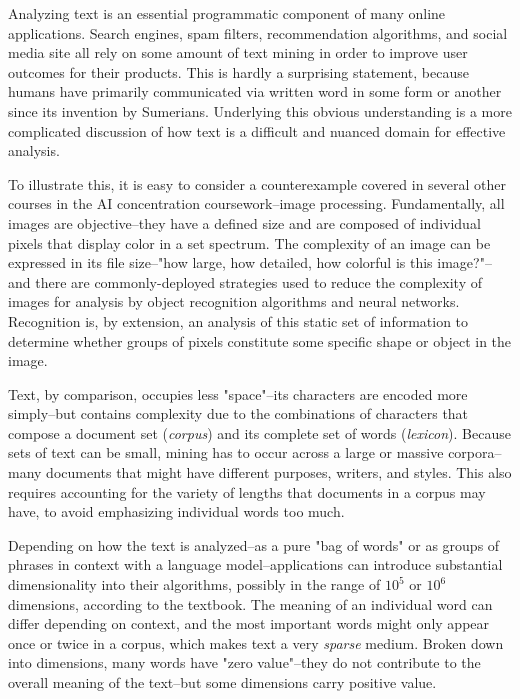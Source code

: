 \documentclass[11pt]{article}
\begin{document}
  
  \graphicspath{{./images/}}
  Analyzing text is an essential programmatic component of many online applications.
  Search engines, spam filters, recommendation algorithms, and social media site all rely on some amount of text mining in order to improve user outcomes for their products.
  This is hardly a surprising statement, because humans have primarily communicated via written word in some form or another since its invention by Sumerians.
  Underlying this obvious understanding is a more complicated discussion of how text is a difficult and nuanced domain for effective analysis.
  
  To illustrate this, it is easy to consider a counterexample covered in several other courses in the AI concentration coursework--image processing.
  Fundamentally, all images are objective--they have a defined size and are composed of individual pixels that display color in a set spectrum.
  The complexity of an image can be expressed in its file size--"how large, how detailed, how colorful is this image?"--and there are commonly-deployed strategies used to reduce the complexity of images for analysis by object recognition algorithms and neural networks.
  Recognition is, by extension, an analysis of this static set of information to determine whether groups of pixels constitute some specific shape or object in the image.
  
  Text, by comparison, occupies less "space"--its characters are encoded more simply--but contains complexity due to the combinations of characters that compose a document set (\textit{corpus}) and its complete set of words (\textit{lexicon}).
  Because sets of text can be small, mining has to occur across a large or massive corpora--many documents that might have different purposes, writers, and styles.
  This also requires accounting for the variety of lengths that documents in a corpus may have, to avoid emphasizing individual words too much.
  
  Depending on how the text is analyzed--as a pure "bag of words" or as groups of phrases in context with a language model--applications can introduce substantial dimensionality into their algorithms, possibly in the range of $10^5$ or $10^6$ dimensions, according to the textbook.
  The meaning of an individual word can differ depending on context, and the most important words might only appear once or twice in a corpus, which makes text a very \textit{sparse} medium.
  Broken down into dimensions, many words have "zero value"--they do not contribute to the overall meaning of the text--but some dimensions carry positive value.  
  
\end{document}
